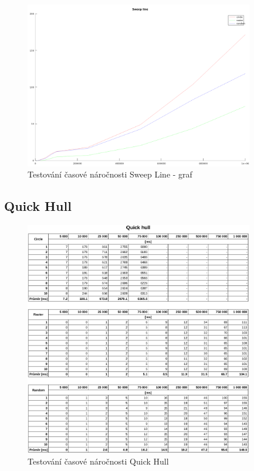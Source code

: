 \documentclass[a4paper, 12pt]{article}
\begin{document}
\begin{figure}[h!]
	\centering
	\includegraphics[width=10cm]{figure_sweep_line.png}
	\caption{Testování časové náročnosti Sweep Line - graf}
\end{figure}

\clearpage

\subsection{Quick Hull}

\begin{figure}[h!]
	\centering
	\includegraphics[width=10cm]{data_quick_hull.png}
	\caption{Testování časové náročnosti Quick Hull}
\end{figure}
\end{document}
